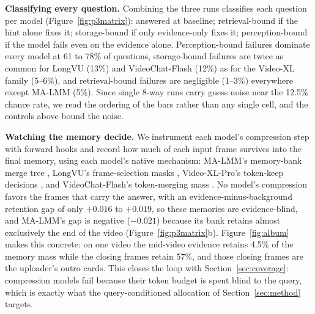 \documentclass{article}
\begin{document}
\textbf{Classifying every question.} Combining the three runs classifies each question per model (Figure~\ref{fig:p3matrix}): answered at baseline; retrieval-bound if the hint alone fixes it; storage-bound if only evidence-only fixes it; perception-bound if the model fails even on the evidence alone. Perception-bound failures dominate every model at 61 to 78\% of questions, storage-bound failures are twice as common for LongVU (13\%) and VideoChat-Flash (12\%) as for the Video-XL family (5--6\%), and retrieval-bound failures are negligible (1--3\%) everywhere except MA-LMM (5\%). Since single 8-way runs carry guess noise near the 12.5\% chance rate, we read the ordering of the bars rather than any single cell, and the controls above bound the noise.

\textbf{Watching the memory decide.} We instrument each model's compression step with forward hooks and record how much of each input frame survives into the final memory, using each model's native mechanism: MA-LMM's memory-bank merge tree \citep{malmm}, LongVU's frame-selection masks \citep{longvu}, Video-XL-Pro's token-keep decisions \citep{videoxlpro}, and VideoChat-Flash's token-merging mass \citep{videochatflash,tome}. No model's compression favors the frames that carry the answer, with an evidence-minus-background retention gap of only $+0.016$ to $+0.019$, so these memories are evidence-blind, and MA-LMM's gap is negative ($-0.021$) because its bank retains almost exclusively the end of the video (Figure~\ref{fig:p3matrix}b). Figure~\ref{fig:album} makes this concrete: on one video the mid-video evidence retains 4.5\% of the memory mass while the closing frames retain 57\%, and those closing frames are the uploader's outro cards. This closes the loop with Section~\ref{sec:coverage}: compression models fail because their token budget is spent blind to the query, which is exactly what the query-conditioned allocation of Section~\ref{sec:method} targets.
\end{document}

